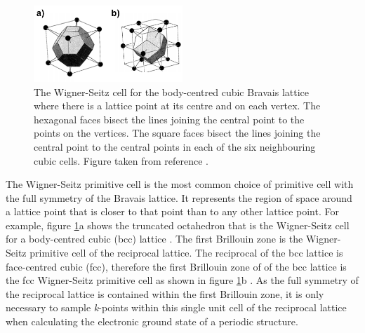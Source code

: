 \begin{figure}[h!]
  \centering
    \includegraphics[width=0.5\textwidth]{figures/Wigner-Seitz.png}
    \caption{The Wigner-Seitz cell for the body-centred cubic Bravais lattice where there is a lattice point at its centre and on each vertex. The hexagonal faces bisect the lines joining the central point to the points on the vertices. The square faces bisect the lines joining the central point to the central points in each of the six neighbouring cubic cells. Figure taken from reference .}
  \label{Wigner-Seitz}
\end{figure}

The Wigner-Seitz primitive cell is the most common choice of primitive cell with the full symmetry of the Bravais lattice. It represents the region of space around a lattice point  that is closer to that point than to any other lattice point. For example, figure \ref{Wigner-Seitz}a shows the truncated octahedron that is the Wigner-Seitz cell for a body-centred cubic (bcc) lattice \cite{AshcroftMermin2}.
The first Brillouin zone is the Wigner-Seitz primitive cell of the reciprocal lattice. The reciprocal of the bcc lattice is face-centred cubic (fcc), therefore the first Brillouin zone of  of the bcc lattice is the fcc Wigner-Seitz primitive cell as shown in figure \ref{Wigner-Seitz}b \cite{AshcroftMermin3}. As the full symmetry of the reciprocal lattice is contained within the first Brillouin zone, it is only necessary to sample \textit{k}-points within this single unit cell of the reciprocal lattice when calculating the electronic ground state of a periodic structure.

 
